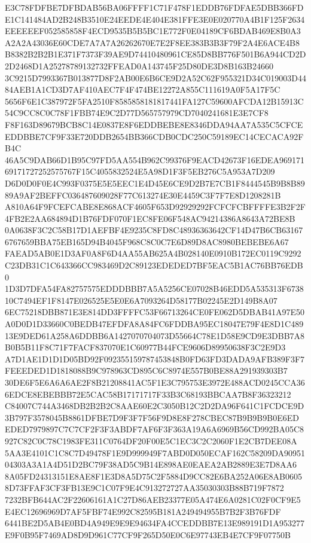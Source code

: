 \documentclass[UTF8,fontset=fandol,zihao=-4,a4paper]{ctexart}
\begin{document}
{{E3C78FDFBE7DFBDAB56BA06FFFF1C71F478F1EDDB76FDFAE5DBB366FDE1C141484AD2B248B3510E24EEDE4E404E381FFE3E0E020770A4B1F125F2634
EEEEEEF052585858F4ECD9535B5B5BC1E772F0E04189CF6BDAB469E8B0A3A2A2A43036E60CDE7A7A7A26262670E7E2F8EE383B3B3F79F2A4E6ACE4B8
B8382B2B2B1E371F7373F39AE9D74410480961CE85D8BB776F501B6A944CD2D2D2468D1A25278789132732FFEAD0A143745F25D80DE3D8B163B24660
3C9215D7993367B013877D8F2AB00E6B6CE9D2A52C62F955321D34C019003D4484AEB1A1CD3D7AF410AEC7F4F474BE12272A855C111619A0F5A17F5C
5656F6E1C387972F5FA2510F8585858181817441FA127C59600AFCDA12B15913C54C9CC8C0C78F1FBB74E9C2D77D565757979CD7040241681E3E7CF8
F8F163D89679BCB8C14E0837E8F6EDDBEBE8E8346DDA94AA7A535C5CFCEEDDBBE7CF9F33E720DDB2654BB366CDB0CDC250C59189EC14CECACA92FB4C
46A5C9DAB66D1B95C97FD5AA554B962C99376F9EACD42673F16EDEA96917169171727252575767F15C4055832524E5A98D1F3F5EB276C5A953A7D209
D6D0D0F0E4C993F0375E5E5EEC1E4D45E6CE9D2B7E7CB1F8444545B9B8B8989A9AF2BEFFC036487609028F77C613274E30E4459C3F7F7E8D1208281B
A810A64F9FCEFCABE8E868ACF4605F653D92929292FCFCFCBFFFFE3B2F2F4FB2E2AA684894D1B76FDF070F1EC8FE06F548AC94214386A8643A72BE8B
0A0638F3C2C58B17D1AEFBF4E9235C8FD8C48936363642CF14D47B6CB631676767659BBA75EB165D94B4045F968C8C0C7E6D89D8AC8980BEBEBE6A67
FAEAD5AB0E1D3AF0A8F6D4AA55AB625A4B028140E0910B172EC0119C9292C23DB31C1C643366CC983469D2C89123EDEDED7BF5EAC5B1AC76BB76EDB0
1D3D7DFA54FA82757575EDDDBBB7A5A5256CE07028B46EDD5A535313F673810C7494EF1F8147E026525E5E0E6A7093264D58177B02245E2D149B8A07
6EC75218DBB871E3E814DD3FFFFC53F66713264CE0FE062D5DBAB41A97E50A0D0D1D33660C0BEDB47EFDFA8A84FC6FDDBA95EC18047E79F4E8D1C489
13E9DED61A258A6DDBB6A1427070704073D55664C78E1D58E9CD9E3DBB7A8B0B5B11F8C71F7FACF837070E1C60977B44FCE9606D89950638F3C2E9D3
A7D1AE1D1D1D05BD92F092355159787453848B0FD63FD3DADA9AFB389F3F7FEEEDED1D1818088B9C978963CD895C6C8974E557B0BE88A291939303B7
30DE6F5E6A6A6AE2F8B21208841AC5F1E3C795753E3972E488ACD0245CCA366EDCE8EBEBBB72E5CAC58B17171717F33B3C68193BBCAA7B8F36323212
C84007C744A3468DB2B2B2C8AAE60E2C3050B12C2D2DA96F641C1FCDCE9D3B797F3578045B8861DFBE7D9F3F7F56F9D8E8F278CBEC87B9B9B9B0E6ED
EDED7979897C7C7CF2F3F3ABDF7AF6F3F363A19A6A6969B56CD992BA05C8927C82C0C78C1983FE311C0764DF20F00E5C1EC3C2C2060F1E2CB7DEE08A
5AA3E4101C1C8C7D49478F1E9D999949F7ABD0D050ECAF162C58209DA9095104303A3A1A4D51D2BC79F38AD5C9B14E898AE0EAEA2AB2889E3E7D8AA6
8A05FD24313151E8AE8F1E3D8A5D75C2F5884D9CC82E6BA252A06E8AB06058D73FFAF3CF3FB13E9C1C07F9E4C913272727AA35030303B88B719F7872
7232BFB644AC2F22606161A1C27D86AEB23377E05A474E6A0281C02F0CF9E5E4EC12696969D7AF5FBF74E992C82595B181A249494955B7B2F3B76FDF
6441BE2D5AB4E0BD4A949E9E9E94634FA4CCEDDBB7E13E989191D1A953277E9F0B95F7469AD8D9D961C77CF9F265D50E0C6E97743EB4E7CF9F07750B
}}
\end{document}
